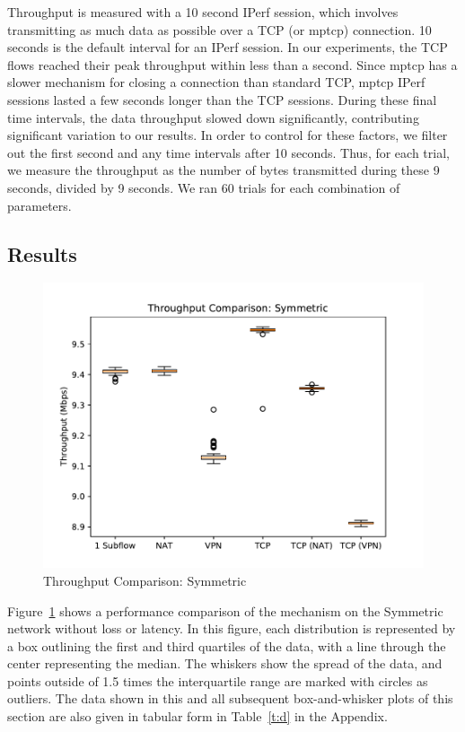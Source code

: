 \documentclass{cwru}
\begin{document}
Throughput is measured with a 10 second IPerf session, which involves
transmitting as much data as possible over a TCP (or \ac{mptcp}) connection. 10
seconds is the default interval for an IPerf session. In our experiments, the
TCP flows reached their peak throughput within less than a second. Since
\ac{mptcp} has a slower mechanism for closing a connection than standard TCP,
\ac{mptcp} IPerf sessions lasted a few seconds longer than the TCP sessions.
During these final time intervals, the data throughput slowed down
significantly, contributing significant variation to our results. In order to
control for these factors, we filter out the first second and any time intervals
after 10 seconds. Thus, for each trial, we measure the throughput as the number
of bytes transmitted during these 9 seconds, divided by 9 seconds. We ran 60
trials for each combination of parameters.

\subsection{Results}

\begin{figure}[htbp]
  \centering
  \includegraphics[height=0.42\textheight]{figures/sym.pdf}
  \caption{Throughput Comparison: Symmetric}
  \label{fig:sym}
\end{figure}

Figure~\ref{fig:sym} shows a performance comparison of the mechanism on the
Symmetric network without loss or latency. In this figure, each distribution is
represented by a box outlining the first and third quartiles of the data, with a
line through the center representing the median. The whiskers show the spread of
the data, and points outside of 1.5 times the interquartile range are marked
with circles as outliers. The data shown in this and all subsequent
box-and-whisker plots of this section are also given in tabular form in
Table~\ref{t:d} in the Appendix.
\end{document}
